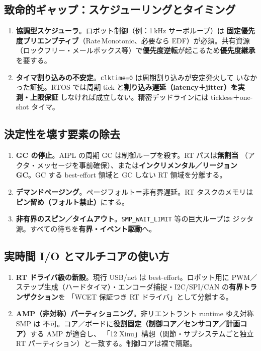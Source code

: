 \documentclass[11pt,a4paper]{article}
\newcommand{\code}[1]{\texttt{#1}}
\newcommand{\prob}[1]{\textbf{\textcolor{red!55!black}{#1}}}
\begin{document}
\subsection{致命的ギャップ：スケジューリングとタイミング}

\begin{enumerate}[leftmargin=1.7em]
  \item[\textbf{①}] \prob{協調型スケジューラ}。ロボット制御（例：1\,kHz サーボループ）は
    \textbf{固定優先度プリエンプティブ}（Rate\,Monotonic、必要なら EDF）が必須。共有資源
    （ロックフリー・メールボックス等）で\textbf{優先度逆転}が起こるため\textbf{優先度継承}を要する。
  \item[\textbf{②}] \prob{タイマ割り込みの不安定}。\code{clktime=0} は周期割り込みが安定発火して
    いなかった証拠。RTOS では周期 tick と\textbf{割り込み遅延（latency＋jitter）を実測・上限保証}
    しなければ成立しない。精密デッドラインには tickless＋one-shot タイマ。
\end{enumerate}

\subsection{決定性を壊す要素の除去}

\begin{enumerate}[leftmargin=1.7em]
  \item[\textbf{③}] \prob{GC の停止}。AIPL の周期 GC は制御ループを殺す。RT パスは\textbf{無割当}
    （アクタ・メッセージを事前確保）、または\textbf{インクリメンタル／リージョン GC}。GC する
    best-effort 領域と GC しない RT 領域を分離する。
  \item[\textbf{④}] \prob{デマンドページング}。ページフォルト＝非有界遅延。RT タスクのメモリは
    \textbf{ピン留め（フォルト禁止）}にする。
  \item[\textbf{⑤}] \prob{非有界のスピン／タイムアウト}。\code{SMP\_WAIT\_LIMIT} 等の巨大ループは
    ジッタ源。すべての待ちを\textbf{有界・イベント駆動}へ。
\end{enumerate}

\subsection{実時間 I/O とマルチコアの使い方}

\begin{enumerate}[leftmargin=1.7em]
  \item[\textbf{⑥}] \textbf{RT ドライバ級の新設}。現行 USB/net は best-effort。ロボット用に
    PWM／ステップ生成（ハードタイマ）・エンコーダ捕捉・I2C/SPI/CAN の\textbf{有界トランザクション}を
    「WCET 保証つき RT ドライバ」として分離する。
  \item[\textbf{⑦}] \textbf{AMP（非対称）パーティショニング}。非リエントラント runtime ゆえ対称 SMP は
    不可。コア／ボードに\textbf{役割固定（制御コア／センサコア／計画コア）}する AMP が適合し、
    「12 Xinu」構想（関節・サブシステムごと独立 RT パーティション）と一致する。制御コアは裸で隔離。
\end{enumerate}
\end{document}
